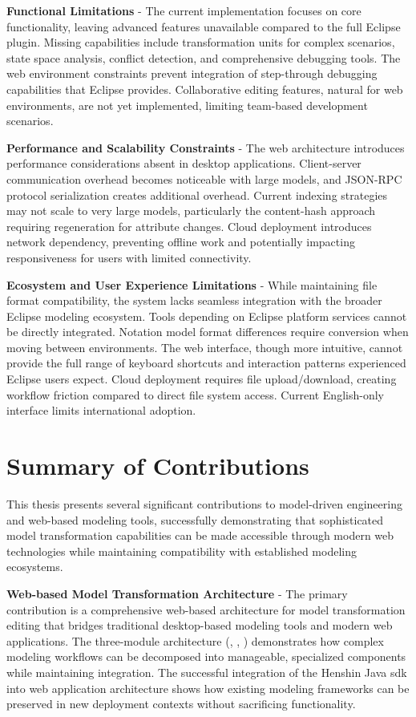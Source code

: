   \textbf{Functional Limitations} - The current implementation focuses on core functionality, leaving advanced features unavailable compared to the full Eclipse plugin. Missing capabilities include transformation units for complex scenarios, state space analysis, conflict detection, and comprehensive debugging tools. The web environment constraints prevent integration of step-through debugging capabilities that Eclipse provides. Collaborative editing features, natural for web environments, are not yet implemented, limiting team-based development scenarios.

  \textbf{Performance and Scalability Constraints} - The web architecture introduces performance considerations absent in desktop applications. Client-server communication overhead becomes noticeable with large models, and JSON-RPC protocol serialization creates additional overhead. Current indexing strategies may not scale to very large models, particularly the content-hash approach requiring regeneration for attribute changes. Cloud deployment introduces network dependency, preventing offline work and potentially impacting responsiveness for users with limited connectivity.

  \textbf{Ecosystem and User Experience Limitations} - While maintaining file format compatibility, the system lacks seamless integration with the broader Eclipse modeling ecosystem. Tools depending on Eclipse platform services cannot be directly integrated. Notation model format differences require conversion when moving between environments. The web interface, though more intuitive, cannot provide the full range of keyboard shortcuts and interaction patterns experienced Eclipse users expect. Cloud deployment requires file upload/download, creating workflow friction compared to direct file system access. Current English-only interface limits international adoption.

  \section{Summary of Contributions}
  \label{subsec:summary-contributions}

  This thesis presents several significant contributions to model-driven engineering and web-based modeling tools, successfully demonstrating that sophisticated model transformation capabilities can be made accessible through modern web technologies while maintaining compatibility with established modeling ecosystems.

  \textbf{Web-based Model Transformation Architecture} - The primary contribution is a comprehensive web-based architecture for model transformation editing that bridges traditional desktop-based modeling tools and modern web applications. The three-module architecture (, , ) demonstrates how complex modeling workflows can be decomposed into manageable, specialized components while maintaining integration. The successful integration of the Henshin Java \ac{sdk} into web application architecture shows how existing modeling frameworks can be preserved in new deployment contexts without sacrificing functionality.

